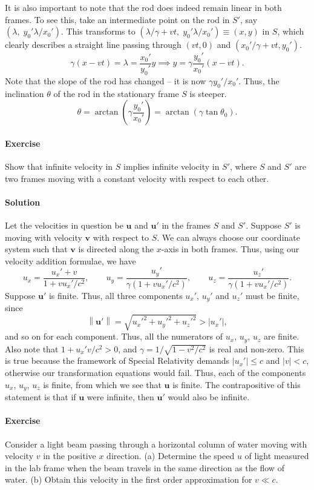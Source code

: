\documentclass[10pt]{article}
\let\vec\boldsymbol
\newcommand\norm[1]{\left\lVert#1\right\rVert}
\newcounter{prob}
\def\problem{\stepcounter{prob}\paragraph{Exercise \arabic{prob}}}
\def\solution{\paragraph{Solution}}
\begin{document}
        It is also important to note that the rod does indeed remain linear in both frames. To see this, take an intermediate point on the rod in $S'$,
        say $(\lambda,\; y_0'\lambda /x_0')$.
        This transforms to $(\lambda /\gamma + vt,\; y_0'\lambda/x_0') \equiv (x, y)$ in $S$, which clearly describes
        a straight line passing through $(vt, 0)$ and $(x_0'/\gamma + vt, y_0')$.
        \[
                \gamma(x - vt) = \lambda = \frac{x_0'}{y_0'}y \implies y = \gamma\frac{y_0'}{x_0'}(x - vt).
        \]
        Note that the slope of the rod has changed -- it is now $\gamma y_0' /x_0'$.
        Thus, the inclination $\theta$ of the rod in the stationary frame $S$ is steeper.
        \[
                \theta = \arctan\left(\gamma\frac{y_0'}{x_0'}\right) = \arctan\left(\gamma \tan\theta_0\right). \tag{b}
        \]

        \problem Show that infinite velocity in $S$ implies infinite velocity in $S'$, where $S$ and $S'$ are two frames
        moving with a constant velocity with respect to each other.

        \solution Let the velocities in question be $\vec{u}$ and $\vec{u}'$ in the frames $S$ and $S'$.
        Suppose $S'$ is moving with velocity $\vec{v}$ with respect to $S$.
        We can always choose our coordinate system such that $\vec{v}$ is directed along the $x$-axis in both frames.
        Thus, using our velocity addition formulae, we have
        \[
                u_x = \frac{u_x' + v}{1 + vu_x'/c^2}, \qquad u_y = \frac{u_y'}{\gamma(1 + vu_x'/c^2)}, \qquad u_z = \frac{u_z'}{\gamma(1 + vu_x'/c^2)}.
        \]
        Suppose $\vec{u}'$ is finite. Thus, all three components $u_x'$, $u_y'$ and $u_z'$ must be finite, since
        \[
                \norm{\vec{u}'} = \sqrt{u_x'^2 + u_y'^2 + u_z'^2} > |u_x'|,
        \]
        and so on for each component. Thus, all the numerators of $u_x$, $u_y$, $u_z$ are finite. Also note that $1 + u_x' v/c^2 > 0$, and 
        $\gamma = 1 /\sqrt{1 - v^2 /c^2}$ is real and non-zero.
        This is true because the framework of Special Relativity demands $|u_x'| \leq c$ and $|v| < c$, otherwise our
        transformation equations would fail.
        Thus, each of the components $u_x$, $u_y$, $u_z$ is finite, from which we see that $\vec{u}$ is finite.
        The contrapositive of this statement is that if $\vec{u}$ were infinite, then $\vec{u}'$ would also be infinite.

        \problem Consider a light beam passing through a horizontal column of water moving with velocity $v$ in the positive $x$ direction.
        (a) Determine the speed $u$ of light measured in the lab frame when the beam travels in the same direction as the flow of water.
        (b) Obtain this velocity in the first order approximation for $v \ll c$.
\end{document}
